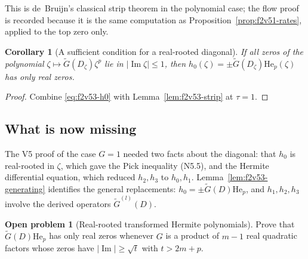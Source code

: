 \documentclass[11pt]{article}
\newtheorem{corollary}[theorem]{Corollary}
\theoremstyle{definition}
\newtheorem{problem}[theorem]{Open problem}
\theoremstyle{remark}
\begin{document}
This is de~Bruijn's classical strip theorem in the polynomial case; the
flow proof is recorded because it is the same computation as
Proposition~\ref{prop:f2v51-rates}, applied to the top zero only.

\begin{corollary}[A sufficient condition for a real-rooted diagonal]
\label{cor:f2v53-sufficient}
If all zeros of the polynomial \(\zeta\mapsto\widetilde G(D_\zeta)\zeta^p\)
lie in \(|\operatorname{Im}\zeta|\le1\), then
\(h_0(\zeta)=\pm\widetilde G(D_\zeta)\mathrm{He}_p(\zeta)\) has only real
zeros.
\end{corollary}

\begin{proof}
Combine \eqref{eq:f2v53-h0} with Lemma~\ref{lem:f2v53-strip} at
\(\tau=1\).
\end{proof}

\subsection{What is now missing}

The V5 proof of the case \(G=1\) needed two facts about the diagonal:
that \(h_0\) is real-rooted in \(\zeta\), which gave the Pick inequality
\textup{(N5.5)}, and the Hermite differential equation, which reduced
\(h_2,h_3\) to \(h_0,h_1\).  Lemma~\ref{lem:f2v53-generating} identifies
the general replacements: \(h_0=\pm\widetilde G(D)\mathrm{He}_p\), and
\(h_1,h_2,h_3\) involve the derived operators \(\widetilde G^{(l)}(D)\).

\begin{problem}[Real-rooted transformed Hermite polynomials]
\label{prob:f2v53-realrooted}
Prove that \(\widetilde G(D)\mathrm{He}_p\) has only real zeros whenever
\(G\) is a product of \(m-1\) real quadratic factors whose zeros have
\(|\operatorname{Im}|\ge\sqrt t\) with \(t>2m+p\).
\end{problem}
\end{document}
